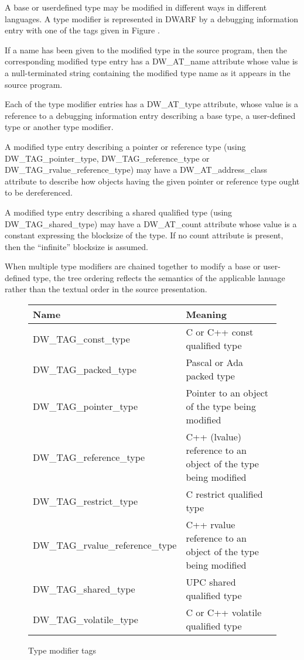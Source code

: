 A base or user\dash defined type may be modified in different ways
in different languages. A type modifier is represented in
DWARF by a debugging information entry with one of the tags
given in 
Figure .


If a name has been given to the modified type in the source
program, then the corresponding modified type entry has
a DW\_AT\_name attribute whose value is a null-terminated
string containing the modified type name as it appears in
the source program.

Each of the type modifier entries has a DW\_AT\_type attribute,
whose value is a reference to a debugging information entry
describing a base type, a user-defined type or another type
modifier.

A modified type entry describing a pointer or reference
type (using DW\_TAG\_pointer\_type, DW\_TAG\_reference\_type or
DW\_TAG\_rvalue\_reference\_type) may have a DW\_AT\_address\_class
attribute to describe how objects having the given pointer
or reference type ought to be dereferenced.

A modified type entry describing a shared qualified type
(using DW\_TAG\_shared\_type) may have a DW\_AT\_count attribute
whose value is a constant expressing the blocksize of the
type. If no count attribute is present, then the “infinite”
blocksize is assumed.

When multiple type modifiers are chained together to modify
a base or user-defined type, the tree ordering reflects the
semantics of the applicable lanuage rather than the textual
order in the source presentation.

\begin{figure}[here]
\centering
\begin{tabular}{lp{9cm}}
Name&Meaning\\ \hline
DW\_TAG\_const\_type &  C or C++ const qualified type \\
DW\_TAG\_packed\_type& Pascal or Ada packed type \\
DW\_TAG\_pointer\_type & Pointer to an object of the type being modified \\
DW\_TAG\_reference\_type& C++ (lvalue) reference to an object of the type 
being modified \\
DW\_TAG\_restrict\_type&C restrict qualified type \\
DW\_TAG\_rvalue\_reference\_type & C++ rvalue reference to an object of the type
being modified \\
DW\_TAG\_shared\_type&UPC shared qualified type \\
DW\_TAG\_volatile\_type&C or C++ volatile qualified type \\
\end{tabular}
\caption{Type modifier tags}
\label{fig:typemodifiertags}
\end{figure}

